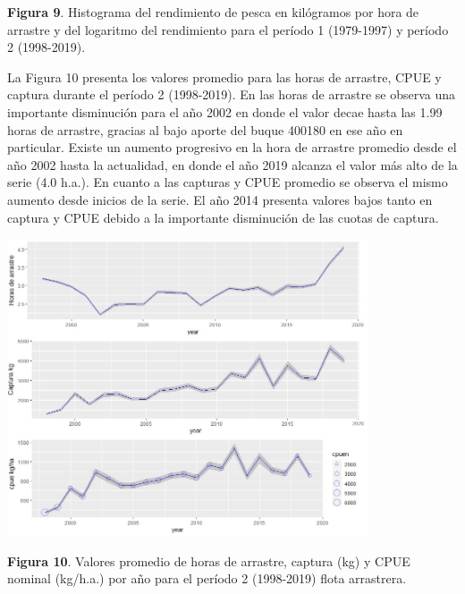 \documentclass[
  spanish,
]{article}
\begin{document}
\small \textbf{Figura 9}. Histograma del rendimiento de pesca en
kilógramos por hora de arrastre y del logaritmo del rendimiento para el
período 1 (1979-1997) y período 2 (1998-2019). \vspace{0.5cm}
\normalsize

La Figura 10 presenta los valores promedio para las horas de arrastre,
CPUE y captura durante el período 2 (1998-2019). En las horas de
arrastre se observa una importante disminución para el año 2002 en donde
el valor decae hasta las 1.99 horas de arrastre, gracias al bajo aporte
del buque 400180 en ese año en particular. Existe un aumento progresivo
en la hora de arrastre promedio desde el año 2002 hasta la actualidad,
en donde el año 2019 alcanza el valor más alto de la serie (4.0 h.a.).
En cuanto a las capturas y CPUE promedio se observa el mismo aumento
desde inicios de la serie. El año 2014 presenta valores bajos tanto en
captura y CPUE debido a la importante disminución de las cuotas de
captura.

\begin{center}
\includegraphics[width=0.8\textwidth]{Figuras/Figura_10.png}
\end{center}

\small \textbf{Figura 10}. Valores promedio de horas de arrastre,
captura (kg) y CPUE nominal (kg/h.a.) por año para el período 2
(1998-2019) flota arrastrera. \vspace{0.5cm} \normalsize
\end{document}

